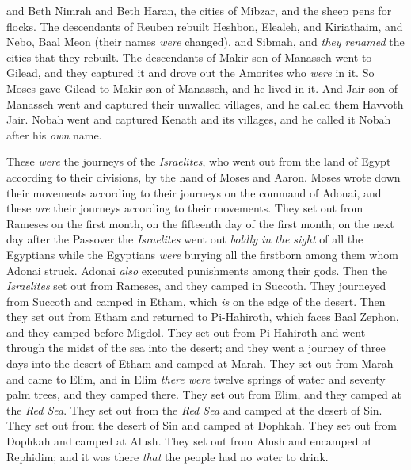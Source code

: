 \begin{biblechapter}
\verse and Beth Nimrah and Beth Haran, the cities of Mibzar, and the sheep pens for flocks.
\verse The descendants of Reuben rebuilt Heshbon, Elealeh, and Kiriathaim,
\verse and Nebo, Baal Meon (their names \textit{were} changed), and Sibmah, and \textit{they renamed} the cities that they rebuilt.
\verse The descendants of Makir son of Manasseh went to Gilead, and they captured it and drove out the Amorites who \textit{were} in it.
\verse So Moses gave Gilead to Makir son of Manasseh, and he lived in it.
\verse And Jair son of Manasseh went and captured their unwalled villages, and he called them Havvoth Jair.
\verse Nobah went and captured Kenath and its villages, and he called it Nobah after his \textit{own} name.
\end{biblechapter}

\begin{biblechapter} %
 These \textit{were} the journeys of the \textit{Israelites}, who went out from the land of Egypt according to their divisions, by the hand of Moses and Aaron.
\verse Moses wrote down their movements according to their journeys on the command of Adonai, and these \textit{are} their journeys according to their movements.
\verse They set out from Rameses on the first month, on the fifteenth day of the first month; on the next day after the Passover the \textit{Israelites} went out \textit{boldly} \textit{in the sight} of all the Egyptians
\verse while the Egyptians \textit{were} burying all the firstborn among them whom Adonai struck. Adonai \textit{also} executed punishments among their gods.
\verse Then the \textit{Israelites} set out from Rameses, and they camped in Succoth.
\verse They journeyed from Succoth and camped in Etham, which \textit{is} on the edge of the desert.
\verse Then they set out from Etham and returned to Pi-Hahiroth, which faces Baal Zephon, and they camped before Migdol.
\verse They set out from Pi-Hahiroth and went through the midst of the sea into the desert; and they went a journey of three days into the desert of Etham and camped at Marah.
\verse They set out from Marah and came to Elim, and in Elim \textit{there were} twelve springs of water and seventy palm trees, and they camped there.
\verse They set out from Elim, and they camped at the \textit{Red Sea}.
\verse They set out from the \textit{Red Sea} and camped at the desert of Sin.
\verse They set out from the desert of Sin and camped at Dophkah.
\verse They set out from Dophkah and camped at Alush.
\verse They set out from Alush and encamped at Rephidim; and it was there \textit{that} the people had no water to drink.

\end{biblechapter}
